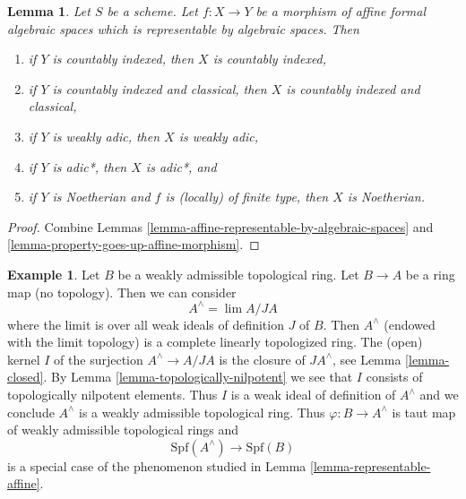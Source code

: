 \documentclass{stacks-project}
\theoremstyle{plain}
\newtheorem{lemma}[subsection]{Lemma}
\theoremstyle{definition}
\newtheorem{example}[subsection]{Example}
\theoremstyle{remark}
\numberwithin{equation}{subsection}
\def\lim{\mathop{\mathrm{lim}}\nolimits}
\begin{document}
\begin{lemma}
\label{lemma-property-goes-up-affine}
Let $S$ be a scheme. Let $f : X \to Y$ be a morphism of affine formal
algebraic spaces which is representable by algebraic spaces. Then
\begin{enumerate}
\item if $Y$ is countably indexed, then $X$ is countably indexed,
\item if $Y$ is countably indexed and classical, then $X$ is countably
indexed and classical,
\item if $Y$ is weakly adic, then $X$ is weakly adic,
\item if $Y$ is adic*, then $X$ is adic*, and
\item if $Y$ is Noetherian and $f$ is (locally) of finite type, then
$X$ is Noetherian.
\end{enumerate}
\end{lemma}

\begin{proof}
Combine Lemmas \ref{lemma-affine-representable-by-algebraic-spaces} and
\ref{lemma-property-goes-up-affine-morphism}.
\end{proof}

\begin{example}
\label{example-representable-morphism-from-completion}
Let $B$ be a weakly admissible topological ring. Let $B \to A$ be
a ring map (no topology). Then we can consider
$$
A^\wedge = \lim A/JA
$$
where the limit is over all weak ideals of definition $J$ of $B$.
Then $A^\wedge$ (endowed with the limit topology) is a
complete linearly topologized ring. The (open) kernel $I$
of the surjection $A^\wedge \to A/JA$ is the closure of $JA^\wedge$, see
Lemma \ref{lemma-closed}. By
Lemma \ref{lemma-topologically-nilpotent}
we see that $I$ consists of topologically nilpotent elements.
Thus $I$ is a weak ideal of definition of $A^\wedge$ and we conclude
$A^\wedge$ is a weakly admissible topological ring. Thus
$\varphi : B \to A^\wedge$ is taut map of weakly admissible
topological rings and
$$
\text{Spf}(A^\wedge) \longrightarrow \text{Spf}(B)
$$
is a special case of the phenomenon studied in
Lemma \ref{lemma-representable-affine}.
\end{example}
\end{document}
